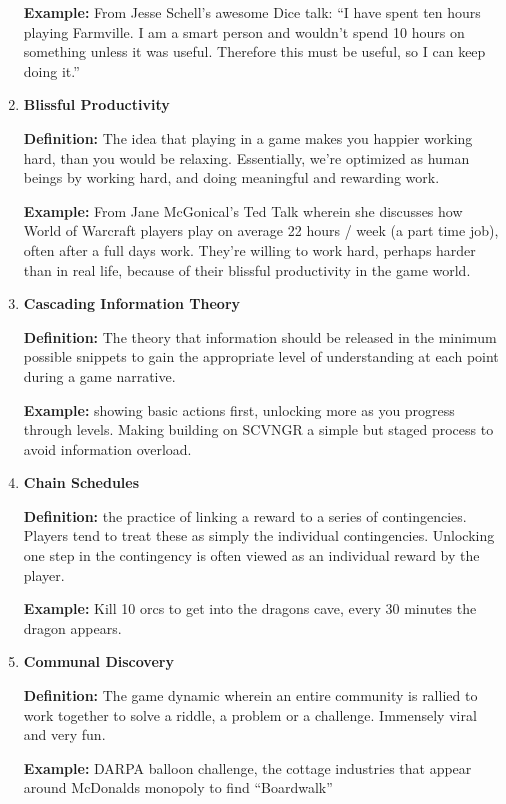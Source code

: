 \begin{enumerate}
\textbf{Example:} From Jesse Schell's awesome Dice talk: “I have spent ten hours playing Farmville. I am a smart person and wouldn’t spend 10 hours on something unless it was useful. Therefore this must be useful, so I can keep doing it.”

\item \textbf{Blissful Productivity}

\textbf{Definition:} The idea that playing in a game makes you happier working hard, than you would be relaxing. Essentially, we’re optimized as human beings by working hard, and doing meaningful and rewarding work.

\textbf{Example:} From Jane McGonical’s Ted Talk wherein she discusses how World of Warcraft players play on average 22 hours / week (a part time job), often after a full days work. They’re willing to work hard, perhaps harder than in real life, because of their blissful productivity in the game world.

\item \textbf{Cascading Information Theory}

\textbf{Definition:} The theory that information should be released in the minimum possible snippets to gain the appropriate level of understanding at each point during a game narrative.

\textbf{Example:} showing basic actions first, unlocking more as you progress through levels. Making building on SCVNGR a simple but staged process to avoid information overload.

\item \textbf{Chain Schedules}

\textbf{Definition:} the practice of linking a reward to a series of contingencies. Players tend to treat these as simply the individual contingencies. Unlocking one step in the contingency is often viewed as an individual reward by the player.

\textbf{Example:} Kill 10 orcs to get into the dragons cave, every 30 minutes the dragon appears.

\item \textbf{Communal Discovery}

\textbf{Definition:} The game dynamic wherein an entire community is rallied to work together to solve a riddle, a problem or a challenge. Immensely viral and very fun.

\textbf{Example:} DARPA balloon challenge, the cottage industries that appear around McDonalds monopoly to find “Boardwalk”


\end{enumerate}
